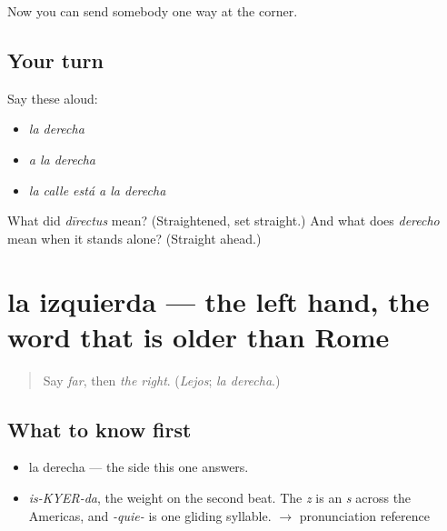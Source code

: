 \begin{grammarlens}[title={What you've built}]
Now you can send somebody one way at the corner.
\end{grammarlens}

\subsection*{Your turn}
Say these aloud:

\begin{itemize}
\raggedright
  \item \emph{la derecha}
  \item \emph{a la derecha}
  \item \emph{la calle está a la derecha}
\end{itemize}

\begin{tcolorbox}[breakable,colback=teal!4,colframe=teal!35!black,title={Before you move on}]
What did \emph{dīrectus} mean? (Straightened, set straight.) And what does \emph{derecho} mean when it stands alone? (Straight ahead.)
\end{tcolorbox}
\section[la izquierda]{la izquierda — the left hand, the word that is older than Rome}

\label{lesson:ES-C340-izquierda}



\begin{quote}
Say \emph{far}, then \emph{the right}. (\emph{Lejos}; \emph{la derecha}.)
\end{quote}

\subsection*{What to know first}
\begin{itemize}
\raggedright
  \item la derecha — the side this one answers.
\end{itemize}

\begin{sounds}
\begin{itemize}
\raggedright
  \item \emph{is-KYER-da}, the weight on the second beat. The \emph{z} is an \emph{s} across the Americas, and \emph{-quie-} is one gliding syllable. $\to$ pronunciation reference
\end{itemize}
\end{sounds}

